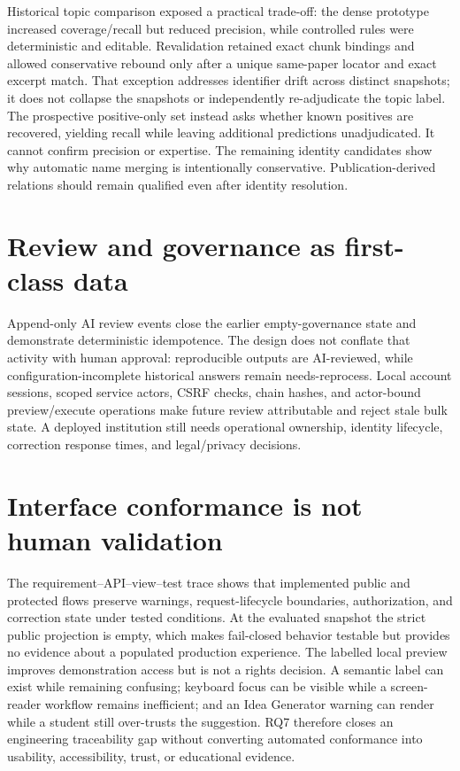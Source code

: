 Historical topic comparison exposed a practical trade-off: the dense prototype increased coverage/recall but reduced precision, while controlled rules were deterministic and editable. Revalidation retained \TopicExactBindingCount{} exact chunk bindings and allowed \TopicReboundBindingCount{} conservative rebound only after a unique same-paper locator and exact excerpt match. That exception addresses identifier drift across distinct snapshots; it does not collapse the snapshots or independently re-adjudicate the topic label. The prospective positive-only set instead asks whether known positives are recovered, yielding recall \VTwoTopicKnownPositiveRecall{} while leaving \VTwoTopicUnadjudicatedPredictionCount{} additional predictions unadjudicated. It cannot confirm precision or expertise. The remaining \PossibleAuthorMergeCount{} identity candidates show why automatic name merging is intentionally conservative. Publication-derived relations should remain qualified even after identity resolution.

\section{Review and governance as first-class data}

Append-only AI review events close the earlier empty-governance state and demonstrate deterministic idempotence. The design does not conflate that activity with human approval: reproducible outputs are AI-reviewed, while configuration-incomplete historical answers remain needs-reprocess. Local account sessions, scoped service actors, CSRF checks, chain hashes, and actor-bound preview/execute operations make future review attributable and reject stale bulk state. A deployed institution still needs operational ownership, identity lifecycle, correction response times, and legal/privacy decisions.

\section{Interface conformance is not human validation}

The requirement--API--view--test trace shows that implemented public and protected flows preserve warnings, request-lifecycle boundaries, authorization, and correction state under tested conditions. At the evaluated snapshot the strict public projection is empty, which makes fail-closed behavior testable but provides no evidence about a populated production experience. The labelled local preview improves demonstration access but is not a rights decision. A semantic label can exist while remaining confusing; keyboard focus can be visible while a screen-reader workflow remains inefficient; and an Idea Generator warning can render while a student still over-trusts the suggestion. RQ7 therefore closes an engineering traceability gap without converting automated conformance into usability, accessibility, trust, or educational evidence.

